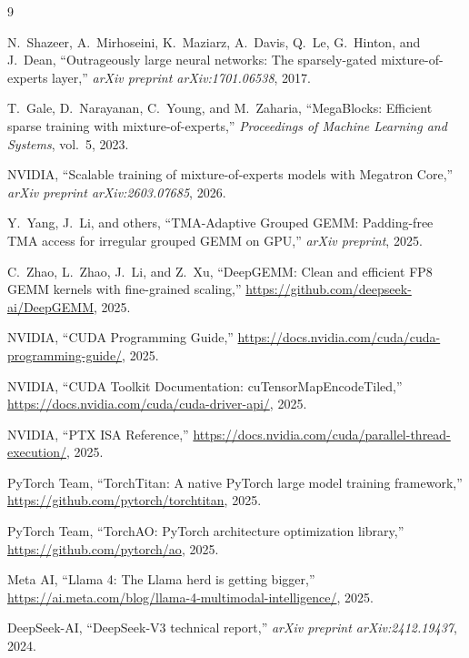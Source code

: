 \documentclass[11pt,a4paper]{article}
\theoremstyle{definition}
\begin{document}
\begin{thebibliography}{9}

N.~Shazeer, A.~Mirhoseini, K.~Maziarz, A.~Davis, Q.~Le, G.~Hinton, and J.~Dean,
``Outrageously large neural networks: The sparsely-gated mixture-of-experts layer,''
\emph{arXiv preprint arXiv:1701.06538}, 2017.

T.~Gale, D.~Narayanan, C.~Young, and M.~Zaharia,
``{MegaBlocks}: Efficient sparse training with mixture-of-experts,''
\emph{Proceedings of Machine Learning and Systems}, vol.~5, 2023.

NVIDIA,
``Scalable training of mixture-of-experts models with {Megatron Core},''
\emph{arXiv preprint arXiv:2603.07685}, 2026.

Y.~Yang, J.~Li, and others,
``{TMA-Adaptive Grouped GEMM}: Padding-free {TMA} access for irregular
grouped {GEMM} on {GPU},''
\emph{arXiv preprint}, 2025.

C.~Zhao, L.~Zhao, J.~Li, and Z.~Xu,
``{DeepGEMM}: Clean and efficient {FP8} {GEMM} kernels with fine-grained
scaling,''
\url{https://github.com/deepseek-ai/DeepGEMM}, 2025.

NVIDIA,
``{CUDA Programming Guide},''
\url{https://docs.nvidia.com/cuda/cuda-programming-guide/}, 2025.

NVIDIA,
``{CUDA Toolkit Documentation: cuTensorMapEncodeTiled},''
\url{https://docs.nvidia.com/cuda/cuda-driver-api/}, 2025.

NVIDIA,
``{PTX ISA Reference},''
\url{https://docs.nvidia.com/cuda/parallel-thread-execution/}, 2025.

PyTorch Team,
``{TorchTitan}: A native {PyTorch} large model training framework,''
\url{https://github.com/pytorch/torchtitan}, 2025.

PyTorch Team,
``{TorchAO}: {PyTorch} architecture optimization library,''
\url{https://github.com/pytorch/ao}, 2025.

Meta AI,
``{Llama 4}: The {Llama} herd is getting bigger,''
\url{https://ai.meta.com/blog/llama-4-multimodal-intelligence/}, 2025.

DeepSeek-AI,
``{DeepSeek-V3} technical report,''
\emph{arXiv preprint arXiv:2412.19437}, 2024.

\end{thebibliography}
\end{document}
